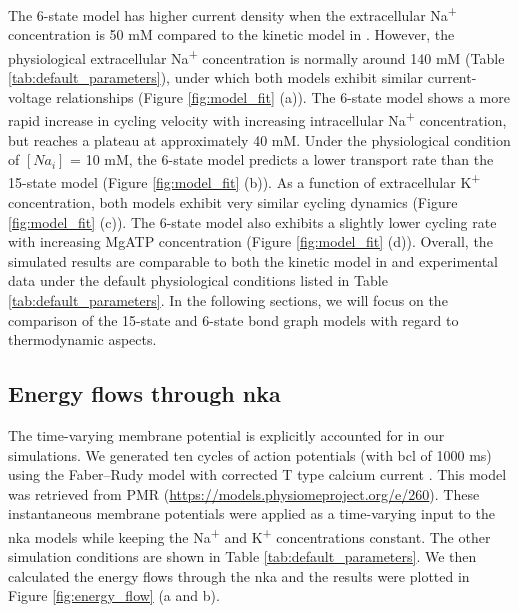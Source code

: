 \documentclass{biophys-new}
\newcommand{\rev}[1]{{\color{black} #1}}
\begin{document}
The 6-state model has higher current density when the extracellular Na\textsuperscript{+} concentration is 50 mM compared to the kinetic model in \cite{pan_cardiac_2020}. \rev{However, the physiological} extracellular Na\textsuperscript{+} concentration is normally around 140 mM \cite{bers_intracellular_2003} (Table \ref{tab:default_parameters}), \rev{under which both models exhibit similar current-voltage relationships (Figure \ref{fig:model_fit} (a)). The 6-state model shows a more rapid increase in cycling velocity with increasing intracellular Na\textsuperscript{+} concentration, but reaches a plateau at approximately 40 mM. Under the physiological condition of $[Na_i]$  = 10 mM, the 6-state model predicts a lower transport rate than the 15-state model (Figure \ref{fig:model_fit} (b)). As a function of extracellular K\textsuperscript{+} concentration, both models exhibit very similar cycling dynamics (Figure \ref{fig:model_fit} (c)). The 6-state model also exhibits a slightly lower cycling rate with increasing MgATP concentration (Figure \ref{fig:model_fit} (d)). Overall,  the simulated results are comparable to both the kinetic model in \cite{pan_cardiac_2020} and experimental data under the default physiological conditions listed in Table \ref{tab:default_parameters}.}
In the following sections, we will focus on the comparison of the 15-state and 6-state bond graph models with regard to thermodynamic aspects.

\subsection*{Energy flows through \gls{nka}}
\label{sec:energy_flow}

\rev{The time-varying membrane potential is explicitly accounted for in our simulations.  We generated ten cycles of action potentials (with \gls{bcl} of 1000 ms) using the Faber--Rudy model \cite{faber_action_2000} with corrected T type calcium current \cite{tong_computational_2014}. This model was retrieved from PMR (\url{https://models.physiomeproject.org/e/260}). These instantaneous membrane potentials were applied as a time-varying input to the} \gls{nka} models while keeping the Na\textsuperscript{+} and K\textsuperscript{+} concentrations constant. The other simulation conditions are shown in Table \ref{tab:default_parameters}. We then calculated the energy flows through the \gls{nka} and the results were plotted in Figure \ref{fig:energy_flow} (a and b). 
\end{document}
